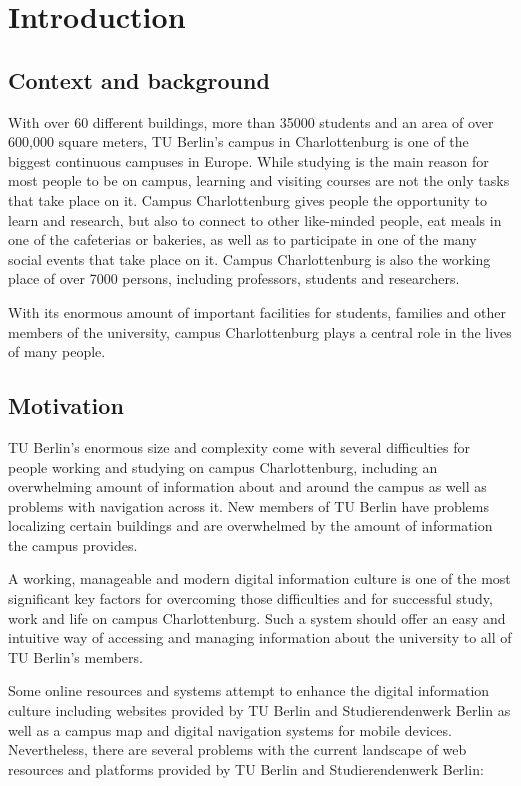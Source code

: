 \chapter{Introduction}
\label{cha:introduction}
\section{Context and background}
With over 60 different buildings, more than 35000 students and an area of over 600,000 square meters, TU Berlin's campus in Charlottenburg is one of the biggest continuous campuses in Europe. While studying is the main reason for most people to be on campus, learning and visiting courses are not the only tasks that take place on it. Campus Charlottenburg gives people the opportunity to learn and research, but also to connect to other like-minded people, eat meals in one of the cafeterias or bakeries, as well as to participate in one of the many social events that take place on it. Campus Charlottenburg is also the working place of over 7000 persons, including professors, students and researchers.

With its enormous amount of important facilities for students, families and other members of the university, campus Charlottenburg plays a central role in the lives of many people.

\section{Motivation}
TU Berlin's enormous size and complexity come with several difficulties for people working and studying on campus Charlottenburg, including an overwhelming amount of information about and around the campus as well as problems with navigation across it. New members of TU Berlin have problems localizing certain buildings and are overwhelmed by the amount of information the campus provides.

A working, manageable and modern digital information culture is one of the most significant key factors for overcoming those difficulties and for successful study, work and life on campus Charlottenburg. Such a system should offer an easy and intuitive way of accessing and managing information about the university to all of TU Berlin's members.

Some online resources and systems attempt to enhance the digital information culture including websites provided by TU Berlin and Studierendenwerk Berlin as well as a campus map and digital navigation systems for mobile devices. Nevertheless, there are several problems with the current landscape of web resources and platforms provided by TU Berlin and Studierendenwerk Berlin:

